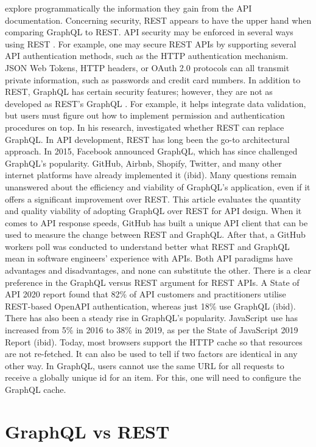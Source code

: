 explore programmatically the information they gain from the API documentation.
Concerning security, REST appears to have the upper hand when comparing GraphQL
to REST. API security may be enforced in several ways using REST
\citep{vadlamaniCanGraphQLReplace2021}. For example, one may secure REST APIs by
supporting several API authentication methods, such as the HTTP authentication
mechanism. JSON Web Tokens, HTTP headers, or OAuth 2.0 protocols can all
transmit private information, such as passwords and credit card numbers. In
addition to REST, GraphQL has certain security features; however, they are not
as developed as REST's GraphQL \citep{lawiEvaluatingGraphQLREST2021}. For
example, it helps integrate data validation, but users must figure out how to
implement permission and authentication procedures on top. In his research,
\citet{vadlamaniCanGraphQLReplace2021} investigated whether REST can replace
GraphQL. In API development, REST has long been the go-to architectural approach.
In 2015, Facebook announced GraphQL, which has since challenged GraphQL's
popularity. GitHub, Airbnb, Shopify, Twitter, and many other internet platforms
have already implemented it (ibid). Many questions remain unanswered about the
efficiency and viability of GraphQL's application, even if it offers a
significant improvement over REST. This article evaluates the quantity and
quality viability of adopting GraphQL over REST for API design. When it comes to
API response speeds, GitHub has built a unique API client that can be used to
measure the change between REST and GraphQL. After that, a GitHub workers poll
was conducted to understand better what REST and GraphQL mean in software
engineers' experience with APIs. Both API paradigms have advantages and
disadvantages, and none can substitute the other. There is a clear preference in
the GraphQL versus REST argument for REST APIs. A State of API 2020 report found
that 82\% of API customers and practitioners utilise REST-based OpenAPI
authentication, whereas just 18\% use GraphQL (ibid). There has also been a
steady rise in GraphQL's popularity. JavaScript use has increased from 5\% in
2016 to 38\% in 2019, as per the State of JavaScript 2019 Report (ibid). Today,
most browsers support the HTTP cache so that resources are not re-fetched. It
can also be used to tell if two factors are identical in any other way. In
GraphQL, users cannot use the same URL for all requests to receive a globally
unique id for an item. For this, one will need to configure the GraphQL cache.

\section{GraphQL vs REST}
\label{s:GraphQLvsRest}

